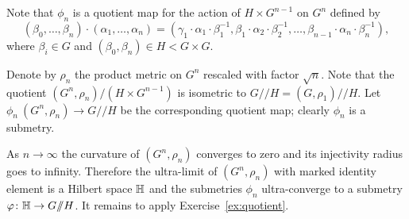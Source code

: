 Note that $\phi_n$ is a quotient map for the action of $H\times G^{n-1}$ on $G^n$ defined by
\[(\beta_0,\dots,\beta_n)\cdot(\alpha_1,\dots,\alpha_n)=(\gamma_1\cdot \alpha_1\cdot\beta_1^{-1},\beta_1\cdot\alpha_2\cdot\beta_2^{-1},\dots,\beta_{n-1}\cdot\alpha_n\cdot\beta_n^{-1}),\]
where $\beta_i\in G$ and $(\beta_0,\beta_n)\in H<G\times G$.

Denote by $\rho_n$ the product metric on $G^n$ rescaled with factor $\sqrt{n}$.
Note that the quotient $(G^n,\rho_n)/(H\times G^{n-1})$ is isometric to $G/\!\!/H=(G,\rho_1)/\!\!/H$.
Let $\phi_n\:(G^n,\rho_n)\to G/\!\!/H$ be the corresponding quotient map; 
clearly $\phi_n$ is a submetry. 

As $n\to\infty$ the curvature of $(G^n,\rho_n)$ converges to zero and its injectivity radius goes to infinity.
Therefore the ultra-limit of $(G^n,\rho_n)$ with marked identity element is a Hilbert space $\mathbb{H}$ and the submetries $\phi_n$ ultra-converge to a submetry $\varphi\colon\mathbb{H}\to G/\!\!/H$.
It remains to apply Exercise~\ref{ex:quotient}.
\qeds
